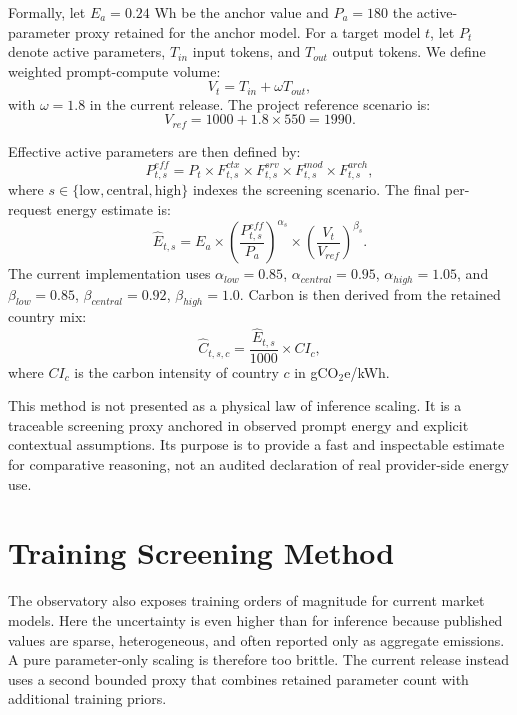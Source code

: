 \documentclass[runningheads]{llncs}
\begin{document}
Formally, let $E_a = 0.24$ Wh be the anchor value and $P_a = 180$ the active-parameter proxy retained for the anchor model. For a target model $t$, let $P_t$ denote active parameters, $T_{in}$ input tokens, and $T_{out}$ output tokens. We define weighted prompt-compute volume:
\begin{equation}
V_t = T_{in} + \omega T_{out},
\end{equation}
with $\omega = 1.8$ in the current release. The project reference scenario is:
\begin{equation}
V_{ref} = 1000 + 1.8 \times 550 = 1990.
\end{equation}

Effective active parameters are then defined by:
\begin{equation}
P^{eff}_{t,s} = P_t \times F^{ctx}_{t,s} \times F^{srv}_{t,s} \times F^{mod}_{t,s} \times F^{arch}_{t,s},
\end{equation}
where $s \in \{\mathrm{low}, \mathrm{central}, \mathrm{high}\}$ indexes the screening scenario. The final per-request energy estimate is:
\begin{equation}
\hat{E}_{t,s} = E_a \times \left(\frac{P^{eff}_{t,s}}{P_a}\right)^{\alpha_s}
\times \left(\frac{V_t}{V_{ref}}\right)^{\beta_s}.
\end{equation}
The current implementation uses $\alpha_{low}=0.85$, $\alpha_{central}=0.95$, $\alpha_{high}=1.05$, and $\beta_{low}=0.85$, $\beta_{central}=0.92$, $\beta_{high}=1.0$. Carbon is then derived from the retained country mix:
\begin{equation}
\hat{C}_{t,s,c} = \frac{\hat{E}_{t,s}}{1000} \times CI_c,
\end{equation}
where $CI_c$ is the carbon intensity of country $c$ in gCO$_2$e/kWh.

This method is not presented as a physical law of inference scaling. It is a traceable screening proxy anchored in observed prompt energy and explicit contextual assumptions. Its purpose is to provide a fast and inspectable estimate for comparative reasoning, not an audited declaration of real provider-side energy use.

\section{Training Screening Method}
The observatory also exposes training orders of magnitude for current market models. Here the uncertainty is even higher than for inference because published values are sparse, heterogeneous, and often reported only as aggregate emissions. A pure parameter-only scaling is therefore too brittle. The current release instead uses a second bounded proxy that combines retained parameter count with additional training priors.
\end{document}
